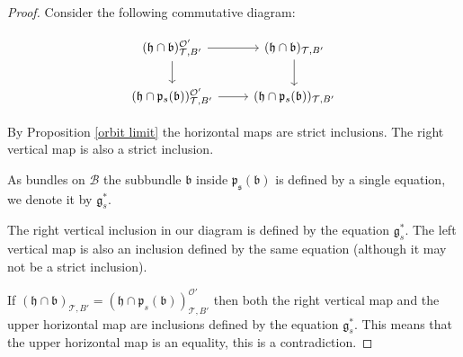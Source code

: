 \documentclass[12pt]{article}
\newcommand{\B}{\mathcal{B}}
\theoremstyle{plain}
\theoremstyle{definition}
\begin{document}
\begin{proof}
     Consider the following commutative diagram:


    
    \[\begin{tikzcd}
	   {(\mathfrak{h}\cap \mathfrak{b} )^{\mathcal{O}'}_{ \mathcal{T},B'}} & {(\mathfrak{h}\cap \mathfrak{b})_{\mathcal{T},B'}} \\
	   {(\mathfrak{h}\cap \mathfrak{p}_{s}(\mathfrak{b}))^{\mathcal{O}'}_{\mathcal{T},B'}} & {(\mathfrak{h}\cap \mathfrak{p}_{s}(\mathfrak{b}))_{\mathcal{T},B'}}
	   \arrow[from=1-1, to=1-2]
	   \arrow[from=1-1, to=2-1]
	   \arrow[from=1-2, to=2-2]
	   \arrow[from=2-1, to=2-2]
    \end{tikzcd}\]

    By Proposition \ref{orbit limit} the horizontal maps are strict inclusions. The right vertical map is also a strict inclusion.
    
    As bundles on $\B$ the subbundle $\mathfrak{b}$ inside $\mathfrak{p_s}(\mathfrak{b})$ is defined by a single equation, we denote it by $\mathfrak{g}_s^*$.
    
    The right vertical inclusion in our diagram is defined by the equation $\mathfrak{g}_{s}^*$. The left vertical map is also an inclusion defined by the same equation (although it may not be a strict inclusion).

    
 If $(\mathfrak{h}\cap \mathfrak{b})_{\mathcal{T},B'}= (\mathfrak{h}\cap \mathfrak{p}_{s}(\mathfrak{b}))^{\mathcal{O}'}_{\mathcal{T},B'}$ then both the right vertical map and the upper horizontal map are inclusions defined by the equation $\mathfrak{g}_{s}^*$. This means that the upper horizontal map is an equality, this is a contradiction.
\end{proof}
\end{document}
